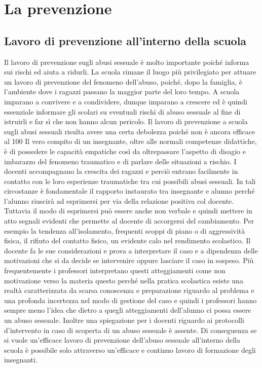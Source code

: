 \section{La prevenzione}
\subsection{Lavoro di prevenzione all’interno della scuola}
Il lavoro di prevenzione sugli abusi sessuale è molto importante poiché informa sui rischi ed aiuta a ridurli. La scuola rimane il luogo più privilegiato per attuare un lavoro di prevenzione del fenomeno dell’abuso, poiché, dopo la famiglia, è l’ambiente dove i ragazzi passano la maggior parte del loro tempo. A scuola imparano a convivere e a condividere, dunque imparano a crescere ed è quindi essenziale informare gli scolari su eventuali rischi di abuso sessuale al fine di istruirli e far sì che non hanno alcun pericolo. Il lavoro di prevenzione a scuola sugli abusi sessuali risulta avere una certa debolezza poiché non è ancora efficace al 100%
Il vero compito di un insegnante, oltre alle normali competenze didattiche, è di possedere le capacità empatiche così da oltrepassare l’aspetto di disagio e imbarazzo del fenomeno traumatico e di parlare delle situazioni a rischio. I docenti accompagnano la crescita dei ragazzi e perciò entrano facilmente in contatto con le loro esperienze traumatiche tra cui possibili abusi sessuali. In tali circostanze è fondamentale il rapporto instaurato tra insegnante e alunno perché l’alunno riuscirà ad esprimersi per via della relazione positiva col docente. Tuttavia il modo di esprimersi può essere anche non verbale e quindi mettere in atto segnali evidenti che permette al docente di accorgersi del cambiamento. Per esempio la tendenza all’isolamento, frequenti scoppi di piano o di aggressività fisica, il rifiuto del contatto fisico, un evidente calo nel rendimento scolastico. Il docente fa le sue considerazioni e prova a interpretare il caso e a dipendenza delle motivazioni che si da decide se intervenire oppure lasciare il caso in sospeso. Più frequentemente i professori interpretano questi atteggiamenti come non motivazione verso la materia questo perché nella pratica scolastica esiste una realtà caratterizzata da scarsa conoscenza e preparazione riguardo al problema e una profonda incertezza nel modo di gestione del caso e quindi i professori hanno sempre meno l’idea che dietro a quegli atteggiamenti dell’alunno ci possa essere un abuso sessuale. Inoltre una spiegazione per i docenti riguardo ai protocolli d’intervento in caso di scoperta di un abuso sessuale è assente. Di conseguenza se si vuole un’efficace lavoro di prevenzione dell’abuso sessuale all’interno della scuola è possibile solo attraverso un’efficace e continuo lavoro di formazione degli insegnanti.
